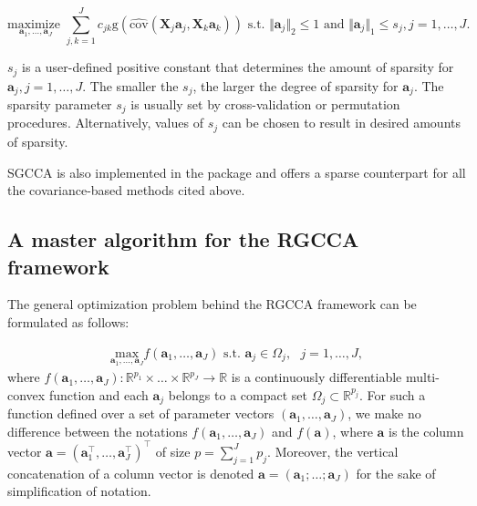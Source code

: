 \documentclass[
]{jss}
\begin{document}
\begin{equation}
\displaystyle \underset{\mathbf{a}_1, \ldots,\mathbf{a}_J}{\text{maximize }} \sum_{j, k = 1}^J c_{jk}\text{g}\left(\widehat{\text{cov}}\left(\mathbf{X}_j\mathbf{a}_j, \mathbf{X}_k\mathbf{a}_k\right)\right) \text{ s.t. } \Vert \mathbf{a}_j \Vert_2 \le 1 \text{ and } \Vert \mathbf{a}_j \Vert_1 \le s_j, j=1,\ldots,J.
\label{optim_SGCCA}
\end{equation}

\(s_j\) is a user-defined positive constant that determines the amount
of sparsity for \(\mathbf{a}_j, j=1, \ldots,J\). The smaller the
\(s_j\), the larger the degree of sparsity for \(\mathbf{a}_j\). The
sparsity parameter \(s_j\) is usually set by cross-validation or
permutation procedures. Alternatively, values of \(s_j\) can be chosen
to result in desired amounts of sparsity.

SGCCA is also implemented in the  package and offers a sparse
counterpart for all the covariance-based methods cited above.

\subsection{A master algorithm for the RGCCA
framework}\label{a-master-algorithm-for-the-rgcca-framework}

The general optimization problem behind the RGCCA framework can be
formulated as follows:

\begin{align}
\underset{ \mathbf a_1, \ldots, \mathbf a_J}{\text{max}} f( \mathbf a_1, \ldots, \mathbf a_J)
\text{ s.t. }  \mathbf a_j \in \Omega_j, \text{ } j = 1, \ldots, J,
\label{master_optim}
\end{align} where
\(f( \mathbf a_1, \ldots, \mathbf a_J):\mathbb{R}^{p_1}\times \ldots \times \mathbb{R}^{p_J} \xrightarrow{}\mathbb{R}\)
is a continuously differentiable multi-convex function and each
\(\mathbf a_j\) belongs to a compact set
\(\Omega_j \subset \mathbb{R}^{p_j}\). For such a function defined over
a set of parameter vectors \(( \mathbf a_1, \ldots, \mathbf a_J)\), we
make no difference between the notations
\(f( \mathbf a_1, \ldots, \mathbf a_J)\) and \(f( \mathbf a)\), where
\(\mathbf a\) is the column vector
\(\mathbf a = \left(  \mathbf a_1^\top, \ldots,  \mathbf a_J^\top\right)^\top\)
of size \(p = \sum_{j=1}^{J}p_j\). Moreover, the vertical concatenation
of a column vector is denoted
\(\mathbf a = \left(  \mathbf a_1; \ldots;  \mathbf a_J \right)\) for
the sake of simplification of notation.
\end{document}
